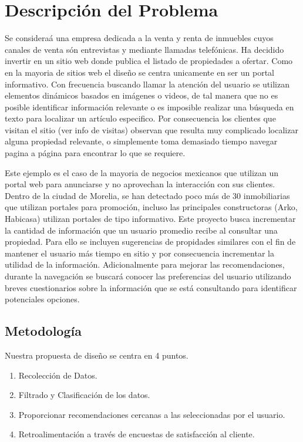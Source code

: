 \section{Descripción del Problema}\label{descripciuxf3n-del-problema}

Se consideraá una empresa dedicada a la venta y renta de inmuebles cuyos canales  de venta són  entrevistas y mediante llamadas telefónicas. Ha decidido invertir en un sitio web donde publica el listado de propiedades a ofertar. Como en la mayoria de sitios web el diseño se centra unicamente en ser un portal informativo. Con frecuencia buscando llamar la atención del usuario se utilizan elementos dinámicos basados en imágenes o videos,  de tal manera que no es posible identificar información relevante o es imposible realizar una búsqueda en texto para localizar un artículo especifico. Por consecuencia los clientes que visitan el sitio (ver info de visitas) observan que resulta muy complicado localizar alguna propiedad relevante, o simplemente toma demasiado tiempo navegar pagina a página para encontrar lo que se requiere. 

Este ejemplo es el caso de la mayoria de negocios mexicanos que utilizan un portal web para anunciarse y no aprovechan la interacción con sus clientes.
Dentro de la ciudad de Morelia, se han detectado poco más de 30 inmobiliarias que utilizan portales para promoción, incluso las principales constructoras (Arko, Habicasa) utilizan  portales de tipo informativo. Este proyecto busca incrementar la cantidad de información que un usuario promedio recibe al consultar una propiedad. Para ello se incluyen sugerencias de propidades similares con el fin de mantener el usuario más tiempo en sitio y por consecuencia incrementar la utilidad de la información. Adicionalmente para mejorar las recomendaciones, durante la navegación se buscará conocer las preferencias del usuario utilizando  breves cuestionarios sobre la información que se está consultando para identificar potenciales opciones. 

\subsection{Metodología}

Nuestra propuesta de diseño se centra en 4 puntos.
\begin{enumerate}
\item Recolección de Datos.
\item Filtrado y Clasificación de los datos.
\item Proporcionar recomendaciones cercanas a las seleccionadas por el usuario.
\item Retroalimentación a través de encuestas de satisfacción al cliente.
\end{enumerate}


